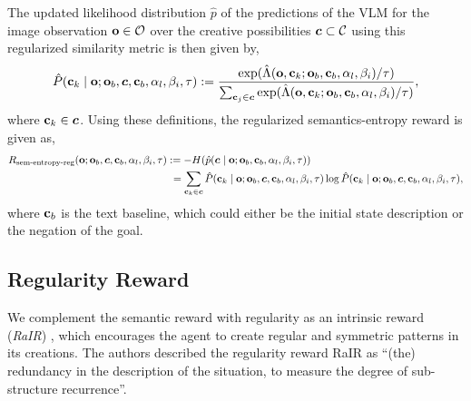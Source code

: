 The updated likelihood distribution \(\hat{p}\) of the predictions of the VLM for the image observation \(\mathbf{o} \in \mathcal{O}\) over the creative possibilities \(\bm{c} \subset \mathcal{C}\) using this regularized similarity metric is then given by,
\begin{equation}
    \label{eq:clip-dist-reg}
    \hat{P}(\mathbf{c}_k \mid \mathbf{o}; \mathbf{o}_b, \bm{c}, \mathbf{c}_b, \alpha_{l}, \beta_{i}, \tau) := \dfrac{\exp(\hat{\Lambda}(\mathbf{o}, \mathbf{c}_k; \mathbf{o}_b, \mathbf{c}_b, \alpha_{l}, \beta_{i})/\tau)}{\sum_{\mathbf{c}_j \in \bm{c}} \exp(\hat{\Lambda}(\mathbf{o}, \mathbf{c}_k; \mathbf{o}_b, \mathbf{c}_b, \alpha_{l}, \beta_{i})/\tau)},
\end{equation}
where \(\mathbf{c}_k \in \bm{c}\). Using these definitions, the regularized semantics-entropy reward is given as,
\begin{align}
    R_{\text{sem-entropy-reg}}(\mathbf{o}; \mathbf{o}_b, \bm{c}, \mathbf{c}_b, \alpha_{l}, \beta_{i}, \tau)
    &:= -H(\hat{p}(\bm{c} \mid \mathbf{o}; \mathbf{o}_b, \mathbf{c}_b, \alpha_{l}, \beta_{i}, \tau)) \label{eq:entropy-reward-reg}\\
    &\ = \sum_{\mathbf{c}_k \in \bm{c}} \hat{P}(\mathbf{c}_k \mid \mathbf{o}; \mathbf{o}_b, \bm{c}, \mathbf{c}_b, \alpha_{l}, \beta_{i}, \tau) \log \hat{P}(\mathbf{c}_k \mid \mathbf{o}; \mathbf{o}_b, \bm{c}, \mathbf{c}_b, \alpha_{l}, \beta_{i}, \tau), \nonumber
\end{align}
where \(\mathbf{c}_b\) is the text baseline, which could either be the initial state description or the negation of the goal.

\newpage
\subsection{Regularity Reward}
\label{sec:regularity-reward}
We complement the semantic reward with regularity as an intrinsic reward (\emph{RaIR}) \citep{rair}, which encourages the agent to create regular and symmetric patterns in its creations.
The authors described the regularity reward RaIR as ``(the) redundancy in the description of the situation, to measure the degree of sub-structure recurrence''.

